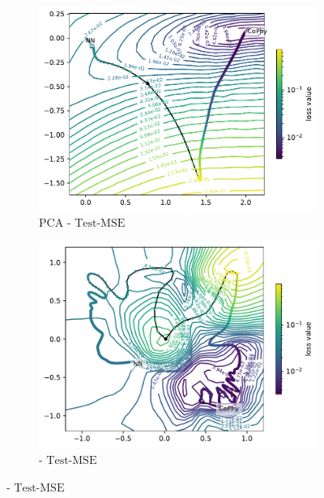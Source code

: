 \documentclass[letterpaper]{article} %
\begin{document}
\begin{figure}[htp]
              \begin{subfigure}[b]{0.3\textwidth}
                \includegraphics[width=\textwidth]{figures/round3/both_PCA/directions.h5_proj_cos_mse_test_loss.h5_test_loss_mse_loss_2dcontour_proj.pdf}
                \caption{PCA - $\text{Test-MSE}$ }
                \label{subfig:pcatest}
              \end{subfigure}
            \begin{subfigure}[b]{0.3\textwidth}
                \includegraphics[width=\textwidth]{figures/round3/both_NV/map_mse_test_loss_loss.pdf}
                \caption{\proposedautencoder{} - $\text{Test-MSE}$ }
                \label{subfig:minetest}
              \end{subfigure}


\end{figure}
\end{document}
